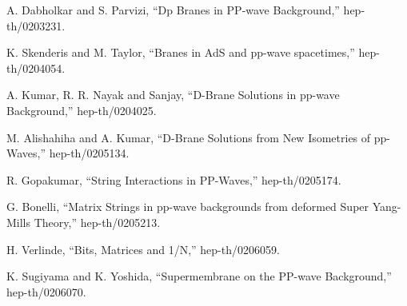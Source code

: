 \documentclass[a4paper,12pt]{article}
\begin{document}
\begin{thebibliography}{99}
 A. Dabholkar and S. Parvizi, ``Dp Branes in PP-wave
Background,'' hep-th/0203231.

 K. Skenderis and M. Taylor, ``Branes in AdS and
pp-wave spacetimes,'' hep-th/0204054.

 A. Kumar, R. R. Nayak and Sanjay, ``D-Brane Solutions in 
pp-wave Background,'' hep-th/0204025. 

 M. Alishahiha and A. Kumar, ``D-Brane Solutions from New 
Isometries of pp-Waves,'' hep-th/0205134. 

 R. Gopakumar, ``String Interactions in PP-Waves,''
hep-th/0205174.

 G. Bonelli, ``Matrix Strings in pp-wave backgrounds
from deformed Super Yang-Mills Theory,'' hep-th/0205213.

 H. Verlinde, ``Bits, Matrices and 1/N,''
hep-th/0206059.

 K. Sugiyama and K. Yoshida, ``Supermembrane on
the PP-wave Background,'' hep-th/0206070.
\end{thebibliography}
\end{document}
